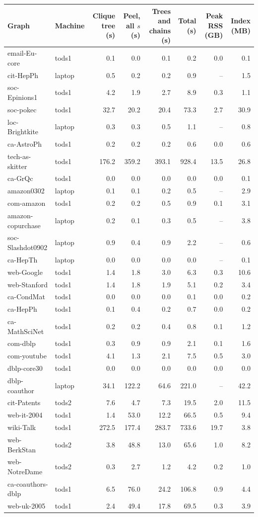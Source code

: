 \begin{tabular}{@{}llrrrrrr@{}}
\toprule
Graph & Machine & Clique tree (s) & Peel, all $s$ (s) & Trees and chains (s) & Total (s) & Peak RSS (GB) & Index (MB) \\
\midrule
email-Eu-core & tods1 & 0.1 & 0.0 & 0.1 & 0.2 & 0.0 & 0.1 \\
cit-HepPh & laptop & 0.5 & 0.2 & 0.2 & 0.9 & -- & 1.5 \\
soc-Epinions1 & tods1 & 4.2 & 1.9 & 2.7 & 8.9 & 0.3 & 1.1 \\
soc-pokec & tods1 & 32.7 & 20.2 & 20.4 & 73.3 & 2.7 & 30.9 \\
loc-Brightkite & laptop & 0.3 & 0.3 & 0.5 & 1.1 & -- & 0.8 \\
ca-AstroPh & tods1 & 0.2 & 0.2 & 0.2 & 0.6 & 0.0 & 0.6 \\
tech-as-skitter & tods1 & 176.2 & 359.2 & 393.1 & 928.4 & 13.5 & 26.8 \\
ca-GrQc & tods1 & 0.0 & 0.0 & 0.0 & 0.0 & 0.0 & 0.1 \\
amazon0302 & laptop & 0.1 & 0.1 & 0.2 & 0.5 & -- & 2.9 \\
com-amazon & tods1 & 0.2 & 0.2 & 0.5 & 0.9 & 0.1 & 3.1 \\
amazon-copurchase & laptop & 0.2 & 0.1 & 0.3 & 0.5 & -- & 3.8 \\
soc-Slashdot0902 & laptop & 0.9 & 0.4 & 0.9 & 2.2 & -- & 0.6 \\
ca-HepTh & laptop & 0.0 & 0.0 & 0.0 & 0.0 & -- & 0.1 \\
web-Google & tods1 & 1.4 & 1.8 & 3.0 & 6.3 & 0.3 & 10.6 \\
web-Stanford & tods1 & 1.4 & 1.8 & 1.9 & 5.1 & 0.2 & 3.4 \\
ca-CondMat & tods1 & 0.0 & 0.0 & 0.0 & 0.1 & 0.0 & 0.2 \\
ca-HepPh & tods1 & 0.1 & 0.4 & 0.2 & 0.7 & 0.0 & 0.2 \\
ca-MathSciNet & tods1 & 0.2 & 0.2 & 0.4 & 0.8 & 0.1 & 1.2 \\
com-dblp & tods1 & 0.3 & 0.9 & 0.9 & 2.1 & 0.1 & 1.6 \\
com-youtube & tods1 & 4.1 & 1.3 & 2.1 & 7.5 & 0.5 & 3.0 \\
dblp-core30 & tods1 & 0.0 & 0.0 & 0.0 & 0.0 & 0.0 & 0.0 \\
dblp-coauthor & laptop & 34.1 & 122.2 & 64.6 & 221.0 & -- & 42.2 \\
cit-Patents & tods2 & 7.6 & 4.7 & 7.3 & 19.5 & 2.0 & 11.5 \\
web-it-2004 & tods1 & 1.4 & 53.0 & 12.2 & 66.5 & 0.5 & 9.4 \\
wiki-Talk & tods1 & 272.5 & 177.4 & 283.7 & 733.6 & 19.7 & 3.8 \\
web-BerkStan & tods2 & 3.8 & 48.8 & 13.0 & 65.6 & 1.0 & 8.2 \\
web-NotreDame & tods2 & 0.3 & 2.7 & 1.2 & 4.2 & 0.2 & 1.0 \\
ca-coauthors-dblp & tods1 & 6.5 & 76.0 & 24.2 & 106.8 & 0.9 & 4.4 \\
web-uk-2005 & tods1 & 2.4 & 49.4 & 17.8 & 69.5 & 0.3 & 3.9 \\
\bottomrule
\end{tabular}
